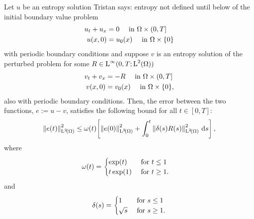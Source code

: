 \documentclass[final]{amsart}
\renewcommand{\d}{\ensuremath{\,\mathrm{d}}}
\newcommand{\tristan}[1]{{\color{purple} Tristan says:  #1 }}
\numberwithin{equation}{section}
\begin{document}
\begin{Lem}\label{theorem_stab_advection}
  Let $u$ be an entropy solution \tristan{entropy not defined until below} of the initial
  boundary value problem
  \begin{equation}
    \label{eq:transport}
    \begin{aligned}
      u_t
      +
      u_x &=0\quad \text{ in }\Omega \times (0,T]
      \\ 
      u( x,0) &= u_0( x) \quad \text{ in } \Omega \times \{0\}
    \end{aligned}
  \end{equation}
  with periodic boundary conditions and suppose $v$ is an entropy solution of the perturbed problem for
  some $R \in \operatorname L^{\infty}(0,T; \operatorname L^{2}(\Omega))$
  \begin{equation}
    \label{eq:ibvpv}
    \begin{aligned}
      v_t
      +
      v_x &=-R\quad \text{ in }\Omega \times (0,T]
      \\
      v( x,0) &= v_0( x) \quad \text{ in } \Omega \times \{0\},
    \end{aligned}
  \end{equation}
  also with periodic boundary conditions.  Then, the error between the
  two functions, $e:= u-v$, satisfies the following bound for all
  $t\in [0,T]$:
  \begin{equation}
    \Norm{e\qp{t}}^2_{\leb{2}\qp{\W}}
    \leq
    \w(t)
    \qb{\Norm{e\qp{0}}^2_{\leb{2}\qp{\W}}+\int_0^t\Norm{\delta(s) R(s)}^2_{\leb{2}\qp{\W}}  \d s },
  \end{equation}
  where 
  \begin{equation}
    \begin{aligned}
      \omega\!\left({t}\right)&=\begin{cases}
      \exp\!\left({t}\right) &\text{ for } t\leq 1\\
      t\exp\!\left({1}\right)&\text{ for } t\geq 1.\\
      \end{cases}
    \end{aligned}
  \end{equation}
  and
  \begin{equation}
    \delta\!\left({s}\right)=\begin{cases}
    1 &\text{ for } s\leq 1\\
    \sqrt{s}&\text{ for } s\geq 1.\\
    \end{cases}
  \end{equation}
  \end{Lem}
\end{document}
